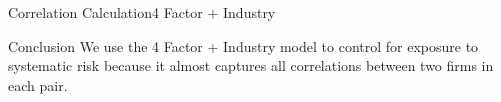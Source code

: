 \documentclass[handout]{beamer}
\begin{document}
\begin{frame}{Correlation Calculation}{4 Factor + Industry}
\begin{enumerate}
		\end{enumerate}
		
			\begin{table}[htbp]
					\centering 
					\scriptsize
					\resizebox{0.7\textwidth}{!}{
						              
					}
				\end{table}
				
				
				\begin{block}{Conclusion}
					\scriptsize
					We use the 4 Factor + Industry model to control for exposure to systematic risk because it almost captures all correlations between two firms in each pair.
				\end{block}
		
	\end{frame}
		
		
%		
		
		
%				              
%		
%		
	
	
\end{document}
